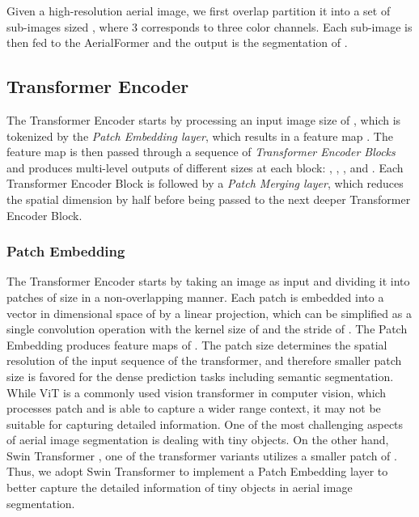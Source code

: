\documentclass[journal]{IEEEtran}
\begin{document}
Given a high-resolution aerial image, we first overlap partition it into a set of sub-images sized , where 3 corresponds to three color channels. Each sub-image is then fed to the AerialFormer and the output is the segmentation of . 



\subsection{Transformer Encoder}
\label{TransEnc}

The Transformer Encoder starts by processing an input image size of , which is tokenized by the \textit{Patch Embedding layer}, which results in a feature map . The feature map is then passed through a sequence of  \textit{Transformer Encoder Blocks} and produces multi-level outputs of different sizes at each block: , , , and  . Each Transformer Encoder Block is followed by a \textit{Patch Merging layer}, which reduces the spatial dimension by half before being passed to the next deeper Transformer Encoder Block.



\subsubsection{Patch Embedding}
The Transformer Encoder starts by taking an image  as input and dividing it into patches of size  in a non-overlapping manner. Each patch is embedded into a vector in dimensional space of  by a linear projection, which can be simplified as a single convolution operation with the kernel size of  and the stride of . The Patch Embedding produces feature maps of .
The patch size determines the spatial resolution of the input sequence of the transformer, and therefore smaller patch size is favored for the dense prediction tasks including semantic segmentation. While ViT \cite{dosovitskiy2020image} is a commonly used vision transformer in computer vision, which  processes  patch and is able to capture a wider range context, it may not be suitable for capturing detailed information. One of the most challenging aspects of aerial image segmentation is dealing with tiny objects. On the other hand, Swin Transformer \cite{liu2021swin}, one of the transformer variants utilizes a smaller patch of . Thus, we adopt Swin Transformer \cite{liu2021swin} to implement a Patch Embedding layer to better capture the detailed information of tiny objects in aerial image segmentation.
\end{document}

